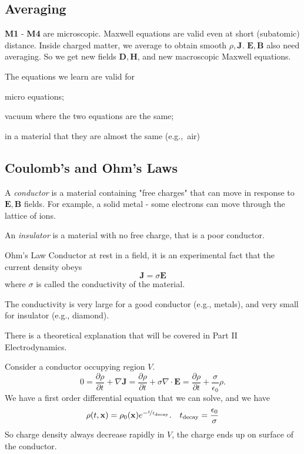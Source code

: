 \subsection{Averaging}
\textbf{M1} - \textbf{M4} are microscopic. Maxwell equations are valid even at short (subatomic) distance. Inside charged matter, we average to obtain smooth \(\rho, \mathbf{J} \). \(\mathbf{E} , \mathbf{B} \) also need averaging. So we get new fields \(\mathbf{D}, \textbf{H} \), and new macroscopic Maxwell equations.

The equations we learn are valid for
\begin{enumerate*}
    \item micro equations;
    \item vacuum where the two equations are the same;
    \item in a material that they are almost the same (e.g.,\ air)
\end{enumerate*}

\subsection{Coulomb's and Ohm's Laws}
\leavevmode
\begin{definition}{}{}
    A \textit{conductor} is a material containing "free charges" that can move in response to \(\mathbf{E}, \mathbf{B} \) fields. For example, a solid metal - some electrons can move through the lattice of ions.

    An \textit{insulator} is a material with no free charge, that is a poor conductor.
\end{definition}
\begin{theorem}{Ohm's Law}{}
    Conductor at rest in a field, it is an experimental fact that the current density obeys
    \[
        \mathbf{J} = \sigma \mathbf{E}
    \]
    where \(\sigma\) is called the conductivity of the material.
\end{theorem}
The conductivity is very large for a good conductor (e.g., metals), and very small for insulator (e.g., diamond).

There is a theoretical explanation that will be covered in Part II Electrodynamics.

Consider a conductor occupying region \(V\).
\[
    0 = \frac{\partial \rho}{\partial t} +\nabla \mathbf{J} = \frac{\partial \rho}{\partial t} + \sigma \nabla \cdot \mathbf{E} = \frac{\partial \rho}{\partial t} + \frac{\sigma}{\epsilon_0}\rho.
\]
We have a first order differential equation that we can solve, and we have
\[
    \rho(t,\mathbf{x} ) = \rho_0(\mathbf{x} )e^{-\nicefrac{t}{t_{\text{decay}}}}. \quad t_{\text{decay}} = \frac{\epsilon_0}{\sigma}
\]
So charge density always decrease rapidly in \(V\), the charge ends up on surface of the conductor.

